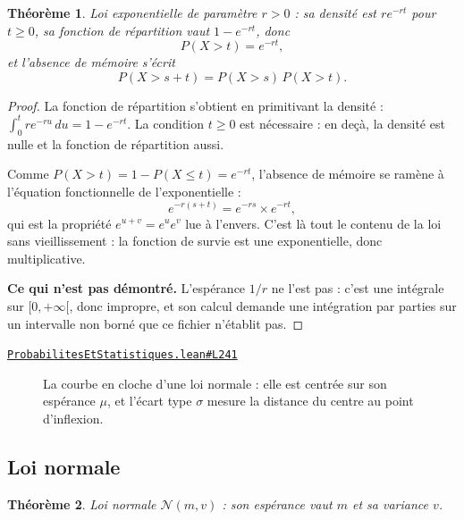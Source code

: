 \documentclass[11pt,a4paper]{article}
\theoremstyle{definition}
\theoremstyle{plain}
\newtheorem{theoreme}{Théorème}
\newcommand{\source}[2]{\par\smallskip\noindent\hfill{\footnotesize\href{#1}{\texttt{#2}}}\par\smallskip}
\begin{document}
\begin{theoreme}
Loi exponentielle de paramètre $r > 0$ : sa densité est $r e^{-rt}$ pour $t \ge 0$, sa
fonction de répartition vaut $1 - e^{-rt}$, donc
\[ P(X > t) = e^{-rt} , \]
et l'absence de mémoire s'écrit
\[ P(X > s + t) = P(X > s)\,P(X > t) . \]
\end{theoreme}

\begin{proof}
La fonction de répartition s'obtient en primitivant la densité : $\int_0^t r e^{-ru}\,du = 1 - e^{-rt}$. La condition
$t \ge 0$ est nécessaire : en deçà, la densité est nulle et la fonction de répartition
aussi.

Comme $P(X > t) = 1 - P(X \le t) = e^{-rt}$, l'absence de mémoire se ramène à l'équation
fonctionnelle de l'exponentielle :
\[ e^{-r(s+t)} = e^{-rs} \times e^{-rt} , \]
qui est la propriété $e^{u+v} = e^{u}e^{v}$ lue à l'envers. C'est là tout le contenu de la
\og{} loi sans vieillissement \fg{} : la fonction de survie est une exponentielle, donc
multiplicative.

\medskip\noindent
\textbf{Ce qui n'est pas démontré.} L'espérance $1/r$ ne l'est pas : c'est une intégrale
sur $[0, +\infty[$, donc impropre, et son calcul demande une intégration par parties sur un
intervalle non borné que ce fichier n'établit pas.
\end{proof}
\source{https://github.com/Commutator-IO/learn-lean/blob/main/courses/02-lycee/09-probabilites-et-statistiques/ProbabilitesEtStatistiques.lean\#L241}{ProbabilitesEtStatistiques.lean\#L241}

\begin{figure}[h]
\centering

\caption{La courbe en cloche d'une loi normale : elle est centrée sur son espérance $\mu$, et l'écart type $\sigma$ mesure la distance du centre au point d'inflexion.}
\end{figure}

\subsection{Loi normale}

\begin{theoreme}
Loi normale $\mathcal{N}(m, v)$ : son espérance vaut $m$ et sa variance $v$.
\end{theoreme}
\end{document}
